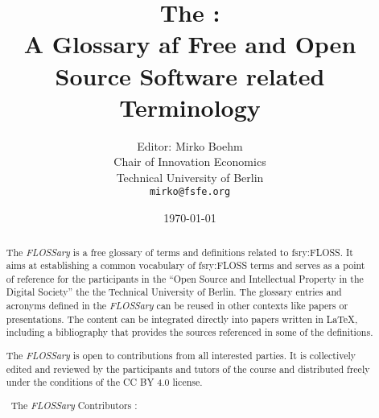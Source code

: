 \documentclass[a4paper]{article}
\title{The \flossary:\\
  A Glossary af Free and Open Source Software related Terminology}
\author{Editor: Mirko Boehm\\
  Chair of Innovation Economics\\
  Technical University of Berlin\\
  \texttt{mirko@fsfe.org}}
\date{\today}
\newcommand{\flossary}{{\em FLOSSary} }
\begin{document}
\maketitle \thispagestyle{empty}
\begin{abstract}
  \noindent
  The \flossary is a free glossary of terms and definitions related to
  \gls{fsry:FLOSS}. It aims at establishing a common vocabulary of
  \gls{fsry:FLOSS} terms and serves as a point of reference for the
  participants in the ``Open Source and Intellectual Property in the
  Digital Society'' the the Technical University of Berlin. The
  glossary entries and acronyms defined in the \flossary can be reused
  in other contexts like papers or presentations. The content can be
  integrated directly into papers written in \LaTeX, including a
  bibliography that provides the sources referenced in some of the
  definitions.

  The \flossary is open to contributions from all interested
  parties. It is collectively edited and reviewed by the participants
  and tutors of the course and distributed freely under the conditions
  of the CC BY 4.0 license.

  \vspace{0.5cm}
  \noindent \textcopyright~The \flossary Contributors \ccby:
  \\ 
\end{abstract}

\clearpage
\glsaddall
{}
\printnoidxglossary[nonumberlist]
\clearpage
\printnoidxglossary[type=\acronymtype,nonumberlist]
\clearpage
\printbibliography
\end{document}
